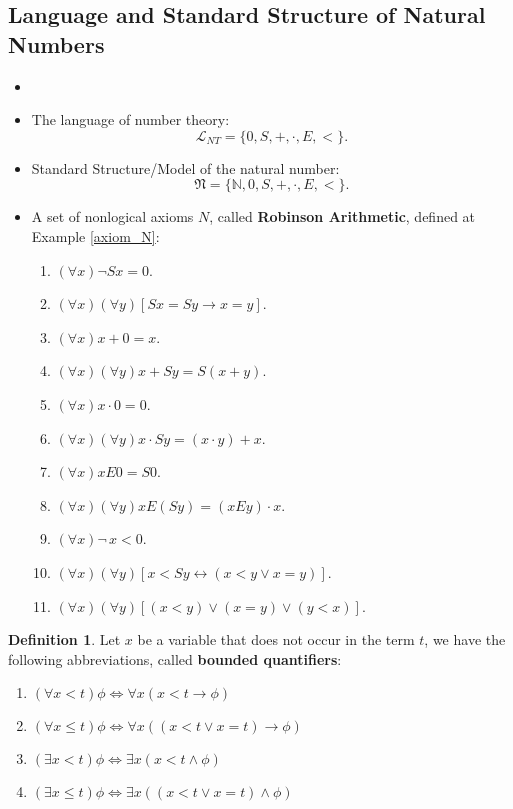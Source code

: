 \documentclass[11pt,letterpaper]{book}
\theoremstyle{definition}
\newtheorem{definition}{Definition}[section]
\begin{document}
\subsection{Language and Standard Structure of Natural Numbers}
\begin{itemize}
\item[]
\item{The language of number theory: $$ \mathcal{L}_{NT} = \{ 0, S, +,
\cdot,E,< \} .$$}
\item{Standard Structure/Model of the natural number: $$ \mathfrak{N}
= \{ \mathbb{N}, 0, S,+, \cdot, E, < \} .$$}
\item{A set of nonlogical axioms $N$, called \textbf{Robinson Arithmetic}, defined at Example \ref{axiom_N}:
\begin{enumerate}
\item{$ (\forall x) \lnot S x = 0$.}
\item{$ (\forall x)(\forall y) [Sx = Sy \rightarrow x = y] $.}
\item{$ (\forall x) x + 0 = x $.}
\item{$ (\forall x)(\forall y)x + Sy = S(x+y) $.}
\item{$ (\forall x) x \cdot 0 = 0 $.}
\item{$ (\forall x)(\forall y) x \cdot Sy = (x \cdot y) + x $.}
\item{$ (\forall x) x E 0 = S 0 $.}
\item{$ (\forall x)(\forall y) x E (S y) = (x E y) \cdot x $.}
\item{$ (\forall x) \lnot\, x < 0 $.}
\item{$ (\forall x)(\forall y) [x < Sy \longleftrightarrow (x < y \lor x = y
)] $.}
\item{$ (\forall x)(\forall y) [(x<y) \lor (x = y) \lor (y < x) ] $.}

\end{enumerate}

}
\end{itemize}


\begin{definition}\label{def:bounded_quantifiers}
Let $x$ be a variable that does not occur in the term $t$, we have the
following abbreviations, called \textbf{bounded quantifiers}:
\begin{enumerate}
\item{$(\forall x < t ) \phi \Leftrightarrow \forall x ( x < t
\rightarrow \phi ) $}
\item{$(\forall x \leq t ) \phi \Leftrightarrow \forall x ( (x < t  \lor
x = t ) \rightarrow \phi ) $}
\item{$(\exists x < t ) \phi \Leftrightarrow \exists x ( x < t \land
\phi ) $}
\item{$(\exists x \leq t ) \phi \Leftrightarrow \exists x ( (x < t \lor
x = t) \land \phi ) $}
\end{enumerate}

\end{definition}
\end{document}
